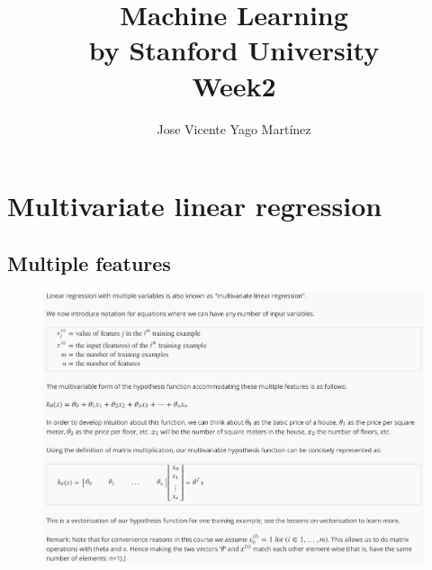 \documentclass[12pt, A4,onecolumn]{article} %
\title{\textbf{Machine Learning\\ 
\small{by Stanford University}\\
Week2
}}
\author{
Jose Vicente Yago Martínez
}%
\begin{document}
\maketitle

	





\newpage
\tableofcontents

\newpage

\section{Multivariate linear regression}

\subsection{Multiple features}

\begin{figure}[H]
	\centering
	\includegraphics[width=1\textwidth]{./Imagenes/linreg1}
\end{figure}
\end{document}
